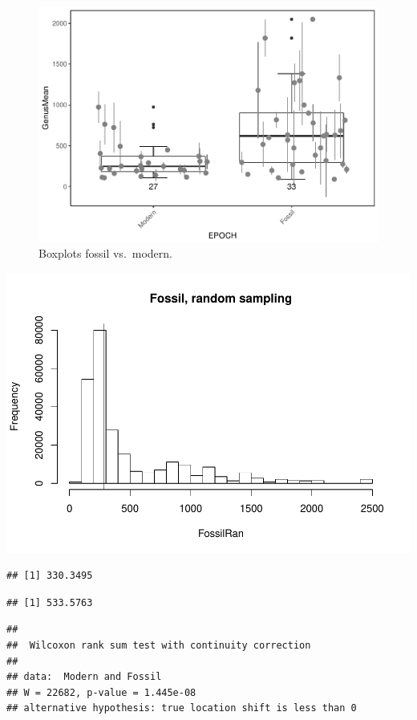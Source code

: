 \documentclass[]{article}
\begin{document}
\begin{figure}[htbp]
\centering
\includegraphics{MA_JJ_files/figure-latex/BPMF-1.pdf}
\caption{Boxplots fossil vs.~modern.}
\end{figure}

\includegraphics{MA_JJ_files/figure-latex/RSFM-1.pdf}

\begin{verbatim}
## [1] 330.3495
\end{verbatim}

\begin{verbatim}
## [1] 533.5763
\end{verbatim}

\begin{verbatim}
## 
##  Wilcoxon rank sum test with continuity correction
## 
## data:  Modern and Fossil
## W = 22682, p-value = 1.445e-08
## alternative hypothesis: true location shift is less than 0
\end{verbatim}
\end{document}
